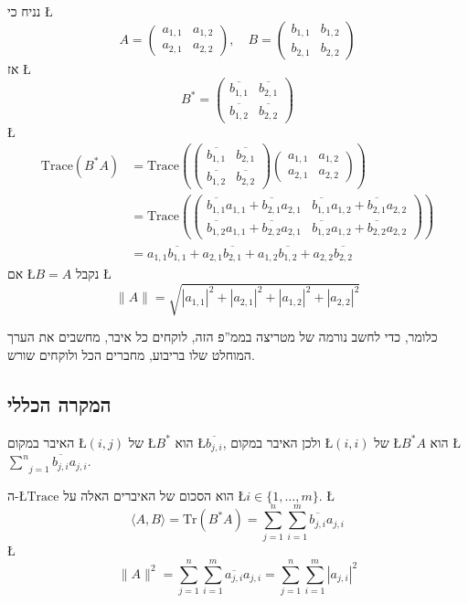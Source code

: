 \documentclass[english,hebrew]{article}
\begin{document}
נניח כי \L{%
\[
A=\begin{pmatrix}a_{1,1} & a_{1,2}\\
a_{2,1} & a_{2,2}
\end{pmatrix},\quad B=\begin{pmatrix}b_{1,1} & b_{1,2}\\
b_{2,1} & b_{2,2}
\end{pmatrix}
\]
}%
אז \L{%
\[
B^{*}=\begin{pmatrix}\overline{b_{1,1}} & \overline{b_{2,1}}\\
\overline{b_{1,2}} & \overline{b_{2,2}}
\end{pmatrix}
\]
}%
\L{%
\begin{align*}
\text{Trace}(B^{*}A) & =\text{Trace}\left(\begin{pmatrix}\overline{b_{1,1}} & \overline{b_{2,1}}\\
\overline{b_{1,2}} & \overline{b_{2,2}}
\end{pmatrix}\begin{pmatrix}a_{1,1} & a_{1,2}\\
a_{2,1} & a_{2,2}
\end{pmatrix}\right)\\
 & =\text{Trace}\left(\begin{pmatrix}\overline{b_{1,1}}a_{1,1}+\overline{b_{2,1}}a_{2,1} & \overline{b_{1,1}}a_{1,2}+\overline{b_{2,1}}a_{2,2}\\
\overline{b_{1,2}}a_{1,1}+\overline{b_{2,2}}a_{2,1} & \overline{b_{1,2}}a_{1,2}+\overline{b_{2,2}}a_{2,2}
\end{pmatrix}\right)\\
 & =a_{1,1}\overline{b_{1,1}}+a_{2,1}\overline{b_{2,1}}+a_{1,2}\overline{b_{1,2}}+a_{2,2}\overline{b_{2,2}}
\end{align*}
}%
אם \L{$B=A$} נקבל \L{%
\[
\|A\|=\sqrt{|a_{1,1}|^{2}+|a_{2,1}|^{2}+|a_{1,2}|^{2}+|a_{2,2}|^{2}}
\]
}%

כלומר, כדי לחשב נורמה של מטריצה בממ\textquotedblright פ הזה, לוקחים
כל איבר, מחשבים את הערך המוחלט שלו בריבוע, מחברים הכל ולוקחים שורש.

\subsection{המקרה הכללי}

האיבר במקום \L{$(i,j)$} של \L{$B^{*}$} הוא \L{$\overline{b_{j,i}}$},
ולכן האיבר במקום \L{$(i,i)$} של \L{$B^{*}A$} הוא \L{$\underset{j=1}{\overset{n}{\sum}}\overline{b_{j,i}}a_{j,i}$}.

ה-\L{$\text{Trace}$} הוא הסכום של האיברים האלה על \L{$i\in\{1,\dots,m\}$}.
\L{%
\[
\langle A,B\rangle=\text{Tr}(B^{*}A)=\sum_{j=1}^{n}\sum_{i=1}^{m}\overline{b_{j,i}}a_{j,i}
\]
}%
\L{%
\[
\|A\|^{2}=\sum_{j=1}^{n}\sum_{i=1}^{m}\overline{a_{j,i}}a_{j,i}=\sum_{j=1}^{n}\sum_{i=1}^{m}|a_{j,i}|^{2}
\]
}%
\end{document}
